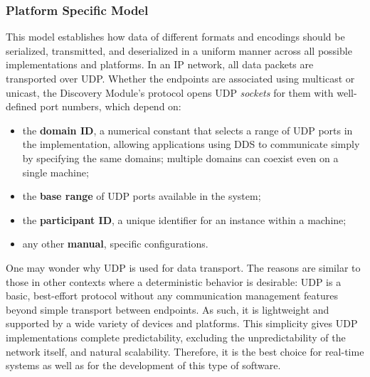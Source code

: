 \subsubsection{Platform Specific Model}
\label{sec:dds_psm}
This model establishes how data of different formats and encodings should be serialized, transmitted, and deserialized in a uniform manner across all possible implementations and platforms. In an IP network, all data packets are transported over UDP. Whether the endpoints are associated using multicast or unicast, the Discovery Module's protocol opens UDP \emph{sockets} for them with well-defined port numbers, which depend on:
\begin{itemize}
  \item the \textbf{domain ID}, a numerical constant that selects a range of UDP ports in the implementation, allowing applications using DDS to communicate simply by specifying the same domains; multiple domains can coexist even on a single machine;
  \item the \textbf{base range} of UDP ports available in the system;
  \item the \textbf{participant ID}, a unique identifier for an instance within a machine;
  \item any other \textbf{manual}, specific configurations.
\end{itemize}
One may wonder why UDP is used for data transport. The reasons are similar to those in other contexts where a deterministic behavior is desirable: UDP is a basic, best-effort protocol without any communication management features beyond simple transport between endpoints. As such, it is lightweight and supported by a wide variety of devices and platforms. This simplicity gives UDP implementations complete predictability, excluding the unpredictability of the network itself, and natural scalability. Therefore, it is the best choice for real-time systems as well as for the development of this type of software.

